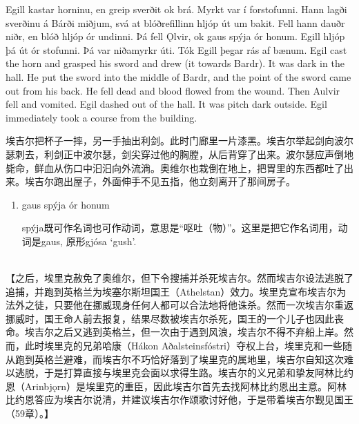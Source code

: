 \begin{paracol}{2}
    Egill kastar horninu, en greip sverðit ok brá. Myrkt var í forstofunni. Hann lagði sverðinu á Bárði miðjum, svá at blóðrefillinn hljóp út um bakit. Fell hann dauðr niðr, en blóð hljóp ór undinni. Þá fell Ǫlvir, ok gaus spýja ór honum. Egill hljóp þá út ór stofunni. Þá var niðamyrkr úti. Tók Egill þegar rás af bænum.
    \switchcolumn
    Egil cast the horn and grasped his sword and drew (it towards Bardr). It was dark in the hall. He put the sword into the middle of Bardr, and the point of the sword came out from his back. He fell dead and blood flowed from the wound. Then Aulvir fell and vomited. Egil dashed out of the hall. It was pitch dark outside. Egil immediately took a course from the building.
\end{paracol}
\begin{translation*}{}
    埃吉尔把杯子一摔，另一手抽出利剑。此时门廊里一片漆黑。埃吉尔举起剑向波尔瑟刺去，利剑正中波尔瑟，剑尖穿过他的胸膛，从后背穿了出来。波尔瑟应声倒地毙命，鲜血从伤口中汩汩向外流淌。奥维尔也栽倒在地上，把胃里的东西都吐了出来。埃吉尔跑出屋子，外面伸手不见五指，他立刻离开了那间房子。
\end{translation*}
\begin{grammar*}{}
    \begin{enumerate}[leftmargin=*]
        \item gaus spýja ór honum

              spýja既可作名词也可作动词，意思是“呕吐（物）”。这里是把它作名词用，动词是gaus, 原形gjósa `gush'.
    \end{enumerate}
\end{grammar*}
\hspace*{\fill}\\
【之后，埃里克赦免了奥维尔，但下令搜捕并杀死埃吉尔。然而埃吉尔设法逃脱了追捕，并跑到英格兰为埃塞尔斯坦国王（Athelstan）效力。埃里克宣布埃吉尔为法外之徒，只要他在挪威现身任何人都可以合法地将他诛杀。然而一次埃吉尔重返挪威时，国王命人前去报复，结果尽数被埃吉尔杀死，国王的一个儿子也因此丧命。埃吉尔之后又逃到英格兰，但一次由于遇到风浪，埃吉尔不得不弃船上岸。然而，此时埃里克的兄弟哈康（Hákon Aðalsteinsfóstri）夺权上台，埃里克和一些随从跑到英格兰避难，而埃吉尔不巧恰好落到了埃里克的属地里，埃吉尔自知这次难以逃脱，于是打算直接与埃里克会面以求得生路。埃吉尔的义兄弟和挚友阿林比约恩（Arinbjǫrn）是埃里克的重臣，因此埃吉尔首先去找阿林比约恩出主意。阿林比约恩答应为埃吉尔说清，并建议埃吉尔作颂歌讨好他，于是带着埃吉尔觐见国王（59章）。】
\hspace*{\fill}\\
